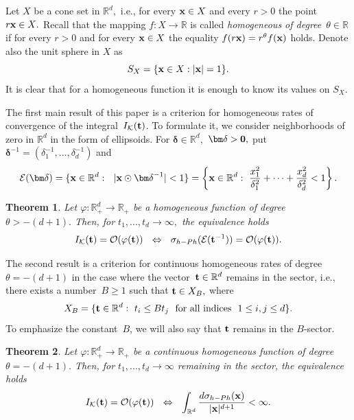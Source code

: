 \documentclass[12pt]{article}
\newtheorem{theorem}{Theorem}
\begin{document}
Let $X$ be a cone set in ${\mathbb{R}^d},$ i.e., for every ${{\bf x}\in X}$ and every ${r>0}$ the point ${r{\bf x}\in X}.$ Recall that the mapping ${f:X\to\mathbb{R}}$ is called \textit{homogeneous of degree}~$\theta\in\mathbb{R}$ if for every $r>0$ and for every ${{\bf x}\in X}$ the equality ${f(r{\bf x})=r^\theta f({\bf x})}$ holds. Denote also the unit sphere in $X$ as
$$
S_X=\{{\bf x}\in X: |{\bf x}|=1\}.
$$
It is clear that for a homogeneous function it is enough to know its values on $S_X.$

The first main result of this paper is a criterion for homogeneous rates of convergence of the integral~${I_{\mathcal{K}}(\bf t)}$.
To formulate it, we consider neighborhoods of zero in $\mathbb{R}^d$ in the form of ellipsoids. For ${{\bm \delta}\in\mathbb{R}^d},$ ${{\bm \delta}>\bf0},$ put ${\bm \delta}^{-1}=(\delta_1^{-1},\dots,\delta_d^{-1})$ and
$$
\mathcal{E}({\bm \delta})=\{{\bf x}\in\mathbb{R}^d:\ \ |{\bf x}\odot{\bm \delta}^{-1}|<1\}=\left\{{\bf x}\in\mathbb{R}^d:\ \frac{x_1^2}{\delta_1^2}+\cdots+\frac{x_d^2}{\delta_d^2}<1\right\}.
$$

\begin{theorem}\label{Th_Criterion1} Let ${\varphi:\mathbb{R}^d_+\to\mathbb{R}_+}$ be a homogeneous function of degree ${\theta>-(d+1)}.$ Then, for ${t_1,...,t_d\to\infty},$ the equivalence holds
	$$
	I_{\mathcal{K}}({\bf t})=\mathcal{O}(\varphi({\bf t}))\ \ \Leftrightarrow\ \ \sigma_{h-Ph}(\mathcal{E}({\bf t}^{-1}))=\mathcal{O}(\varphi({\bf t})).
	$$
\end{theorem}

The second result is a criterion for continuous homogeneous rates of degree ${\theta=-(d+1)}$ in the case where the vector~${{\bf t}\in\mathbb{R}^d}$ remains in the sector, i.e., there exists a number~${B\geq1}$ such that ${{\bf t}\in X_B},$
where
$$
X_B=\{{\bf t}\in\mathbb{R}^d: \ t_i\leq Bt_j\ \ \text{for all indices}\ \ 1\leq i,j\leq d\}.
$$
To emphasize the constant~$B$, we will also say that ${\bf t}$ remains in the $B$-sector.

\begin{theorem}\label{Th_Criterion2} Let ${\varphi:\mathbb{R}^d_+\to\mathbb{R}_+}$ be a continuous homogeneous function of degree ${\theta=-(d+1)}.$ Then, for ${t_1,...,t_d\to\infty}$ remaining in the sector, the equivalence holds
	$$
	I_{\mathcal{K}}({\bf t})=\mathcal{O}(\varphi({\bf t}))\ \ \Leftrightarrow\ \
	\int_{\mathbb{R}^d}\frac{d\sigma_{h-Ph}({\bf x})}{|{\bf x}|^{d+1}}<\infty.
	$$
\end{theorem}
\end{document}
